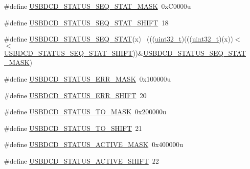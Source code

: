 \begin{DoxyCompactItemize}
\item 
\#define \hyperlink{group___u_s_b_d_c_d___register___masks_gad49d469540afee62a5a62a5419d89cf2}{U\+S\+B\+D\+C\+D\+\_\+\+S\+T\+A\+T\+U\+S\+\_\+\+S\+E\+Q\+\_\+\+S\+T\+A\+T\+\_\+\+M\+A\+SK}~0x\+C0000u
\item 
\#define \hyperlink{group___u_s_b_d_c_d___register___masks_ga8e3d04ac9b5b6195f765f29f82264376}{U\+S\+B\+D\+C\+D\+\_\+\+S\+T\+A\+T\+U\+S\+\_\+\+S\+E\+Q\+\_\+\+S\+T\+A\+T\+\_\+\+S\+H\+I\+FT}~18
\item 
\#define \hyperlink{group___u_s_b_d_c_d___register___masks_ga93cf6b08b2e1b96dbb2713bf57042eab}{U\+S\+B\+D\+C\+D\+\_\+\+S\+T\+A\+T\+U\+S\+\_\+\+S\+E\+Q\+\_\+\+S\+T\+AT}(x)                            ~(((\hyperlink{_p_e___types_8h_a33594304e786b158f3fb30289278f5af}{uint32\+\_\+t})(((\hyperlink{_p_e___types_8h_a33594304e786b158f3fb30289278f5af}{uint32\+\_\+t})(x))$<$$<$\hyperlink{group___u_s_b_d_c_d___register___masks_ga8e3d04ac9b5b6195f765f29f82264376}{U\+S\+B\+D\+C\+D\+\_\+\+S\+T\+A\+T\+U\+S\+\_\+\+S\+E\+Q\+\_\+\+S\+T\+A\+T\+\_\+\+S\+H\+I\+FT}))\&\hyperlink{group___u_s_b_d_c_d___register___masks_gad49d469540afee62a5a62a5419d89cf2}{U\+S\+B\+D\+C\+D\+\_\+\+S\+T\+A\+T\+U\+S\+\_\+\+S\+E\+Q\+\_\+\+S\+T\+A\+T\+\_\+\+M\+A\+SK})
\item 
\#define \hyperlink{group___u_s_b_d_c_d___register___masks_gaa0a0297c32e8af91d40e8cba8ffe8d1e}{U\+S\+B\+D\+C\+D\+\_\+\+S\+T\+A\+T\+U\+S\+\_\+\+E\+R\+R\+\_\+\+M\+A\+SK}~0x100000u
\item 
\#define \hyperlink{group___u_s_b_d_c_d___register___masks_gac82e47386e1af144b9e4d579bacfca50}{U\+S\+B\+D\+C\+D\+\_\+\+S\+T\+A\+T\+U\+S\+\_\+\+E\+R\+R\+\_\+\+S\+H\+I\+FT}~20
\item 
\#define \hyperlink{group___u_s_b_d_c_d___register___masks_ga69616f9e6fd32921dee0543a3cfde633}{U\+S\+B\+D\+C\+D\+\_\+\+S\+T\+A\+T\+U\+S\+\_\+\+T\+O\+\_\+\+M\+A\+SK}~0x200000u
\item 
\#define \hyperlink{group___u_s_b_d_c_d___register___masks_ga2b59871476643f7c428868c6ebbcef5a}{U\+S\+B\+D\+C\+D\+\_\+\+S\+T\+A\+T\+U\+S\+\_\+\+T\+O\+\_\+\+S\+H\+I\+FT}~21
\item 
\#define \hyperlink{group___u_s_b_d_c_d___register___masks_ga6127ac2a4e36e01dfe2c939203f8a72f}{U\+S\+B\+D\+C\+D\+\_\+\+S\+T\+A\+T\+U\+S\+\_\+\+A\+C\+T\+I\+V\+E\+\_\+\+M\+A\+SK}~0x400000u
\item 
\#define \hyperlink{group___u_s_b_d_c_d___register___masks_ga77f2a6e381b526f9d70e13cdf21332a5}{U\+S\+B\+D\+C\+D\+\_\+\+S\+T\+A\+T\+U\+S\+\_\+\+A\+C\+T\+I\+V\+E\+\_\+\+S\+H\+I\+FT}~22
$$
\end{DoxyCompactItemize}
